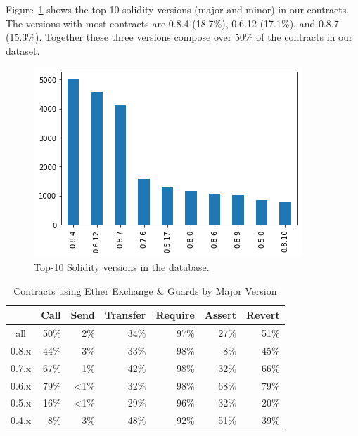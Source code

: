 \documentclass[10pt,conference]{IEEEtran}
\begin{document}
Figure~\ref{fig:minor-versions} shows the top-10 solidity versions (major and minor) in our contracts. The versions with most contracts are 0.8.4 (18.7\%), 0.6.12 (17.1\%), and 0.8.7 (15.3\%). Together these three versions compose over 50\% of the contracts in our dataset.

\begin{figure}[h]
  \centering
  \includegraphics[width=\linewidth]{img/versions_clean.png}
  \caption{Top-10 Solidity versions in the database.}
  \label{fig:minor-versions}
\end{figure}

\begin{table}
\center
  \caption{Contracts using Ether Exchange \& Guards by Major Version}
  \label{tab:results-version}
  \begin{tabular}{crrrrrr}
    \hline
      & Call & Send & Transfer & Require & Assert & Revert \\
    \hline
    all & 50\% & 2\% & 34\% &  97\% & 27\% & 51\% \\
    0.8.x & 44\% & 3\% & 33\%  & 98\% & 8\% & 45\% \\
    0.7.x & 67\% & 1\% & 42\% & 98\% & 32\% & 66\% \\ 
    0.6.x & 79\% & <1\% & 32\% & 98\% & 68\% & 79\% \\
    0.5.x & 16\% & <1\% & 29\% & 96\% & 32\% & 20\% \\
    0.4.x & 8\% & 3\%  & 48\% & 92\% & 51\% & 39\% \\
    \hline
\end{tabular}
\end{table}
\end{document}
